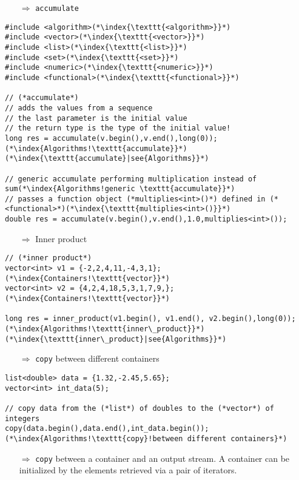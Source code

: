 \documentclass[10pt]{article}
\begin{document}
\begin{enumerate}
\item[$\Rightarrow$] \texttt{accumulate}
\end{enumerate}
\begin{lstlisting}
#include <algorithm>(*\index{\texttt{<algorithm>}}*)
#include <vector>(*\index{\texttt{<vector>}}*)
#include <list>(*\index{\texttt{<list>}}*)
#include <set>(*\index{\texttt{<set>}}*)
#include <numeric>(*\index{\texttt{<numeric>}}*)
#include <functional>(*\index{\texttt{<functional>}}*)

// (*accumulate*)
// adds the values from a sequence
// the last parameter is the initial value
// the return type is the type of the initial value!
long res = accumulate(v.begin(),v.end(),long(0));(*\index{Algorithms!\texttt{accumulate}}*)(*\index{\texttt{accumulate}|see{Algorithms}}*)

// generic accumulate performing multiplication instead of sum(*\index{Algorithms!generic \texttt{accumulate}}*)
// passes a function object (*multiplies<int>()*) defined in (*<functional>*)(*\index{\texttt{multiplies<int>()}}*)
double res = accumulate(v.begin(),v.end(),1.0,multiplies<int>());
\end{lstlisting}
\begin{enumerate}
\item[$\Rightarrow$]  Inner product
\end{enumerate}
\begin{lstlisting}
// (*inner product*)
vector<int> v1 = {-2,2,4,11,-4,3,1};(*\index{Containers!\texttt{vector}}*)
vector<int> v2 = {4,2,4,18,5,3,1,7,9,};(*\index{Containers!\texttt{vector}}*)

long res = inner_product(v1.begin(), v1.end(), v2.begin(),long(0));(*\index{Algorithms!\texttt{inner\_product}}*)(*\index{\texttt{inner\_product}|see{Algorithms}}*)
\end{lstlisting}
\begin{enumerate}
\item[$\Rightarrow$]  \texttt{copy} between different containers
\end{enumerate}
\begin{lstlisting}
list<double> data = {1.32,-2.45,5.65};
vector<int> int_data(5);

// copy data from the (*list*) of doubles to the (*vector*) of integers
copy(data.begin(),data.end(),int_data.begin());(*\index{Algorithms!\texttt{copy}!between different containers}*)
\end{lstlisting}
\begin{enumerate}
\item[$\Rightarrow$]  \texttt{copy} between a container and an output stream. A container can be initialized by the elements retrieved via a pair of iterators.
\end{enumerate}
\end{document}
